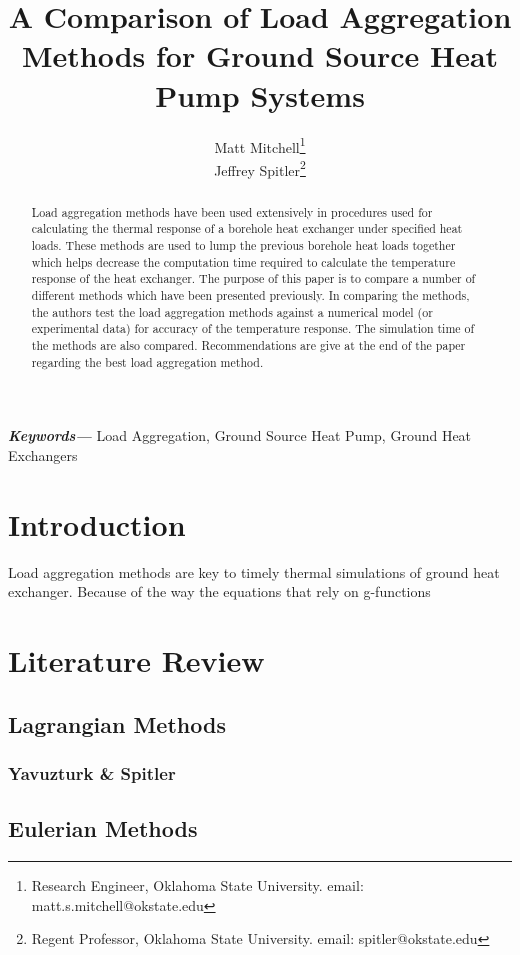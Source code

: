 \documentclass{article}
\title{A Comparison of Load Aggregation Methods for Ground Source Heat Pump Systems}
\author{Matt Mitchell\footnote{Research Engineer, Oklahoma State University. email: matt.s.mitchell@okstate.edu} \\ Jeffrey Spitler\footnote{Regent Professor, Oklahoma State University. email: spitler@okstate.edu}}
\providecommand{\keywords}[1]{\textbf{\textit{Keywords---}} #1}
\begin{document}
\maketitle
{}

\begin{abstract}
Load aggregation methods have been used extensively in procedures used for calculating the thermal response of a borehole heat exchanger under specified heat loads. These methods are used to lump the previous borehole heat loads together which helps decrease the computation time required to calculate the temperature response of the heat exchanger. The purpose of this paper is to compare a number of different methods which have been presented previously. In comparing the methods, the authors test the load aggregation methods against a numerical model (or experimental data) for accuracy of the temperature response. The simulation time of the methods are also compared. Recommendations are give at the end of the paper regarding the best load aggregation method.
\end{abstract}

\keywords{Load Aggregation, Ground Source Heat Pump, Ground Heat Exchangers}

\section{Introduction}

Load aggregation methods are key to timely thermal simulations of ground heat exchanger. Because of the way the equations that rely on g-functions \cite{Adams_Schweickart_1987}


\section{Literature Review}


\subsection{Lagrangian Methods}

\subsubsection{Yavuzturk \& Spitler}

\subsection{Eulerian Methods}
\end{document}
